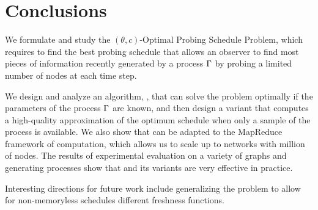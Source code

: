 \section{Conclusions}\label{sec:concl}
We formulate and study the $(\theta,c)$-Optimal Probing Schedule Problem,
which requires to find the best probing schedule that allows an observer to find
most pieces of information recently generated by a process $\Gamma$ by probing a
limited number of nodes at each time step.

We design and analyze an algorithm, \algoname, that can solve the problem
optimally if the parameters of the process $\Gamma$ are known, and then design a
variant that computes a high-quality approximation of the optimum schedule when
only a sample of the process is available. We also show that \algoname can be
adapted to the MapReduce framework of computation, which allows us to scale up
to networks with million of nodes. The results of experimental evaluation on a
variety of graphs and generating processes show that \algoname and its variants
are very effective in practice.

Interesting directions for future work include generalizing the problem to allow
for non-memoryless schedules different freshness functions.
